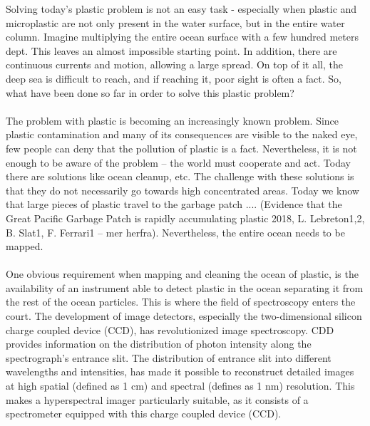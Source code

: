 Solving today’s plastic problem is not an easy task - especially when plastic and microplastic are not only present in the water surface, but in the entire water column. Imagine multiplying the entire ocean surface with a few hundred meters dept. This leaves an almost impossible starting point. In addition, there are continuous currents and motion, allowing a large spread. On top of it all, the deep sea is difficult to reach, and if reaching it, poor sight is often a fact. So, what have been done so far in order to solve this plastic problem?
\\\\
The problem with plastic is becoming an increasingly known problem. Since plastic contamination and many of its consequences are visible to the naked eye, few people can deny that the pollution of plastic is a fact. Nevertheless, it is not enough to be aware of the problem – the world must cooperate and act. Today there are solutions like ocean cleanup, etc. The challenge with these solutions is that they do not necessarily go towards high concentrated areas. Today we know that large pieces of plastic travel to the garbage patch .... (Evidence that the Great Pacific Garbage Patch is rapidly accumulating plastic 2018, L. Lebreton1,2, B. Slat1, F. Ferrari1 – mer herfra). Nevertheless, the entire ocean needs to be mapped.
\\\\
One obvious requirement when mapping and cleaning the ocean of plastic, is the availability of an instrument able to detect plastic in the ocean separating it from the rest of the ocean particles. This is where the field of spectroscopy enters the court. The development of image detectors, especially the two-dimensional silicon charge coupled device (CCD), has revolutionized image spectroscopy. CDD provides information on the distribution of photon intensity along the spectrograph's entrance slit. The distribution of entrance slit into different wavelengths and intensities, has made it possible to reconstruct detailed images at high spatial (defined as 1 cm) and spectral (defines as 1 nm) resolution. This makes a hyperspectral imager particularly suitable, as it consists of a spectrometer equipped with this charge coupled device (CCD). 
